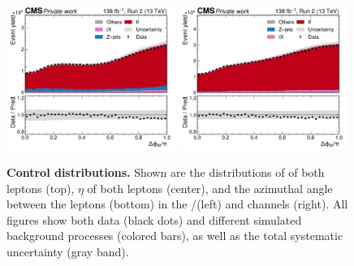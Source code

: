 \begin{figure}[!hp]
    \includegraphics[width=0.49\textwidth]{figures/ah/controlplots/ReqMET/sf/lep_deltaphi_ReqMET_sf.pdf}
    \hfill
    \includegraphics[width=0.49\textwidth]{figures/ah/controlplots/ReqMET/em/lep_deltaphi_ReqMET_em.pdf}
    \caption{
        \textbf{Control distributions.} Shown are the distributions of \pt of both leptons (top), $\eta$ of both leptons (center), and the azimuthal angle \dphill between the leptons (bottom) in the \ee/\mumu (left) and \emu channels (right). All figures show both data (black dots) and different simulated background processes (colored bars), as well as the total systematic uncertainty (gray band). 
    }
    \label{fig:ah:control1}
\end{figure}

